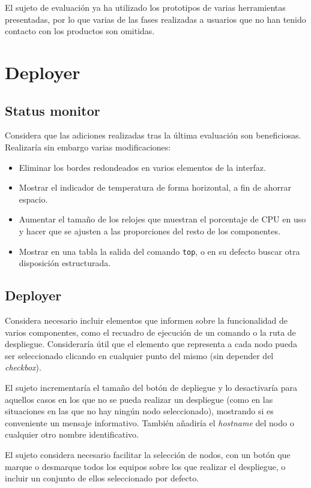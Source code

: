 El sujeto de evaluación ya ha utilizado los prototipos de varias herramientas presentadas, por lo que varias de las fases realizadas a usuarios que no han tenido contacto con los productos son omitidas.

\section{Deployer}

\subsection{Status monitor}

Considera que las adiciones realizadas tras la última evaluación son beneficiosas. Realizaría sin embargo varias modificaciones:

\begin{itemize}
	\item Eliminar los bordes redondeados en varios elementos de la interfaz.
	\item Mostrar el indicador de temperatura de forma horizontal, a fin de ahorrar espacio.
	\item Aumentar el tamaño de los relojes que muestran el porcentaje de CPU en uso y hacer que se ajusten a las proporciones del resto de los componentes.
	\item Mostrar en una tabla la salida del comando \texttt{top}, o en su defecto buscar otra disposición estructurada.
\end{itemize}


\subsection{Deployer}

Considera necesario incluir elementos que informen sobre la funcionalidad de varios componentes, como el recuadro de ejecución de un comando o la ruta de despliegue. Consideraría útil que el elemento que representa a cada nodo pueda ser seleccionado clicando en cualquier punto del mismo (sin depender del \textit{checkbox}).

El sujeto incrementaría el tamaño del botón de depliegue y lo desactivaría para aquellos casos en los que no se pueda realizar un despliegue (como en las situaciones en las que no hay ningún nodo seleccionado), mostrando si es conveniente un mensaje informativo. También añadiría el \textit{hostname} del nodo o cualquier otro nombre identificativo.

El sujeto considera necesario facilitar la selección de nodos, con un botón que marque o desmarque todos los equipos sobre los que realizar el despliegue, o incluir un conjunto de ellos seleccionado por defecto.

